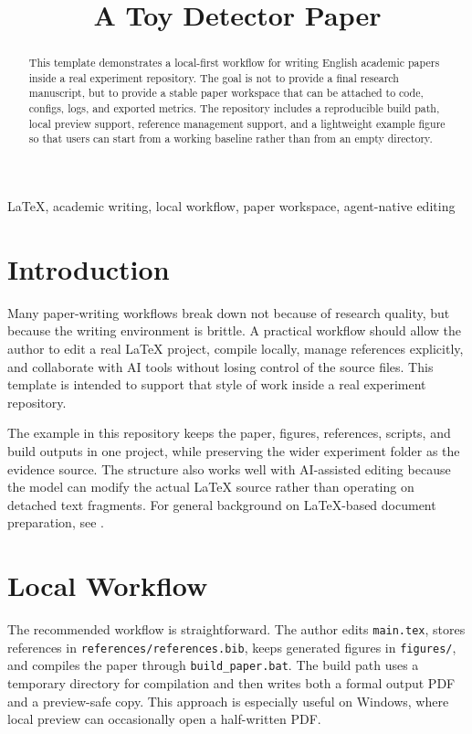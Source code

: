 \documentclass[conference]{IEEEtran}
\title{A Toy Detector Paper}
\author{
\IEEEauthorblockN{Sample Author}
\IEEEauthorblockA{
Open Research Workflow Lab\\
sample@example.com
}
}
\begin{document}
\maketitle

\begin{abstract}
This template demonstrates a local-first workflow for writing English academic papers inside a real experiment repository. The goal is not to provide a final research manuscript, but to provide a stable paper workspace that can be attached to code, configs, logs, and exported metrics. The repository includes a reproducible build path, local preview support, reference management support, and a lightweight example figure so that users can start from a working baseline rather than from an empty directory.
\end{abstract}

\begin{IEEEkeywords}
LaTeX, academic writing, local workflow, paper workspace, agent-native editing
\end{IEEEkeywords}

\section{Introduction}
Many paper-writing workflows break down not because of research quality, but because the writing environment is brittle. A practical workflow should allow the author to edit a real LaTeX project, compile locally, manage references explicitly, and collaborate with AI tools without losing control of the source files. This template is intended to support that style of work inside a real experiment repository.

The example in this repository keeps the paper, figures, references, scripts, and build outputs in one project, while preserving the wider experiment folder as the evidence source. The structure also works well with AI-assisted editing because the model can modify the actual LaTeX source rather than operating on detached text fragments. For general background on LaTeX-based document preparation, see \cite{lamport1994latex}.

\section{Local Workflow}
The recommended workflow is straightforward. The author edits \texttt{main.tex}, stores references in \texttt{references/references.bib}, keeps generated figures in \texttt{figures/}, and compiles the paper through \texttt{build\_paper.bat}. The build path uses a temporary directory for compilation and then writes both a formal output PDF and a preview-safe copy. This approach is especially useful on Windows, where local preview can occasionally open a half-written PDF.
\end{document}
